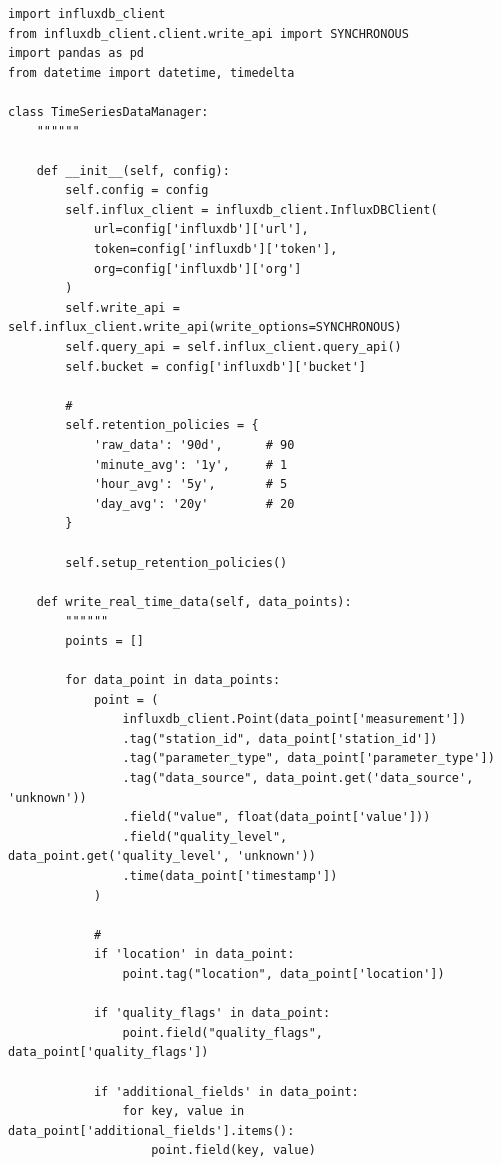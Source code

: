 \hypertarget{section-94}{%
\subsubsection{}\label{section-94}}

\begin{lstlisting}[style=python]
import influxdb_client
from influxdb_client.client.write_api import SYNCHRONOUS
import pandas as pd
from datetime import datetime, timedelta

class TimeSeriesDataManager:
    """"""
    
    def __init__(self, config):
        self.config = config
        self.influx_client = influxdb_client.InfluxDBClient(
            url=config['influxdb']['url'],
            token=config['influxdb']['token'],
            org=config['influxdb']['org']
        )
        self.write_api = self.influx_client.write_api(write_options=SYNCHRONOUS)
        self.query_api = self.influx_client.query_api()
        self.bucket = config['influxdb']['bucket']
        
        # 
        self.retention_policies = {
            'raw_data': '90d',      # 90
            'minute_avg': '1y',     # 1
            'hour_avg': '5y',       # 5
            'day_avg': '20y'        # 20
        }
        
        self.setup_retention_policies()
    
    def write_real_time_data(self, data_points):
        """"""
        points = []
        
        for data_point in data_points:
            point = (
                influxdb_client.Point(data_point['measurement'])
                .tag("station_id", data_point['station_id'])
                .tag("parameter_type", data_point['parameter_type'])
                .tag("data_source", data_point.get('data_source', 'unknown'))
                .field("value", float(data_point['value']))
                .field("quality_level", data_point.get('quality_level', 'unknown'))
                .time(data_point['timestamp'])
            )
            
            # 
            if 'location' in data_point:
                point.tag("location", data_point['location'])
            
            if 'quality_flags' in data_point:
                point.field("quality_flags", data_point['quality_flags'])
                
            if 'additional_fields' in data_point:
                for key, value in data_point['additional_fields'].items():
                    point.field(key, value)
            

\end{lstlisting}
